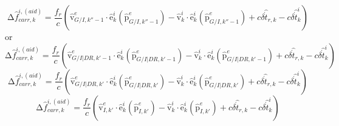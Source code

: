 \documentclass{article}
\begin{document}
\begin{equation}\label{GrindEQ__7_}
\mathrm{\Delta }{\hat{f}}^{i,\left(aid\right)}_{carr,k}\mathrm{=}\frac{f_r}{c}\left({\hat{\boldsymbol{\mathrm{v}}}}^e_{G/I,k''-1}\cdot {\hat{\boldsymbol{\mathrm{e}}}}^i_k\left({\hat{\boldsymbol{\mathrm{p}}}}^e_{G/I,k''-1}\right)-{\hat{\boldsymbol{\mathrm{v}}}}^i_k\cdot {\hat{\boldsymbol{\mathrm{e}}}}^i_k\left({\hat{\boldsymbol{\mathrm{p}}}}^e_{G/I,k''-1}\right)+c\delta {\hat{\dot{t}}}_{r,k}-c\delta {\hat{\dot{t}}}^i_k\right)
\end{equation}
or 
\begin{equation}\label{GrindEQ__8_}
\mathrm{\Delta }{\hat{f}}^{i,\left(aid\right)}_{carr,k}\mathrm{=}\frac{f_r}{c}\left({\hat{\boldsymbol{\mathrm{v}}}}^e_{G/I|DR,k'-1}\cdot {\hat{\boldsymbol{\mathrm{e}}}}^i_k\left({\hat{\boldsymbol{\mathrm{p}}}}^e_{G/I|DR,k'-1}\right)-{\hat{\boldsymbol{\mathrm{v}}}}^i_k\cdot {\hat{\boldsymbol{\mathrm{e}}}}^i_k\left({\hat{\boldsymbol{\mathrm{p}}}}^e_{G/I|DR,k'-1}\right)+c\delta {\hat{\dot{t}}}_{r,k}-c\delta {\hat{\dot{t}}}^i_k\right)
\end{equation}
\begin{equation} \label{GrindEQ__9_}
\mathrm{\Delta }{\hat{f}}^{i,\left(aid\right)}_{carr,k}\mathrm{=}\frac{f_r}{c}\left({\hat{\boldsymbol{\mathrm{v}}}}^e_{G/I|DR,k'}\cdot {\hat{\boldsymbol{\mathrm{e}}}}^i_k\left({\hat{\boldsymbol{\mathrm{p}}}}^e_{G/I|DR,k'}\right)-{\hat{\boldsymbol{\mathrm{v}}}}^i_k\cdot {\hat{\boldsymbol{\mathrm{e}}}}^i_k\left({\hat{\boldsymbol{\mathrm{p}}}}^e_{G/I|DR,k'}\right)+c\delta {\hat{\dot{t}}}_{r,k}-c\delta {\hat{\dot{t}}}^i_k\right)
\end{equation}
\begin{equation}\label{GrindEQ__10_}
\mathrm{\Delta }{\hat{f}}^{i,\left(aid\right)}_{carr,k}\mathrm{=}\frac{f_r}{c}\left({\hat{\boldsymbol{\mathrm{v}}}}^e_{I,k'}\cdot {\hat{\boldsymbol{\mathrm{e}}}}^i_k\left({\hat{\boldsymbol{\mathrm{p}}}}^e_{I,k'}\right)-{\hat{\boldsymbol{\mathrm{v}}}}^i_k\cdot {\hat{\boldsymbol{\mathrm{e}}}}^i_k\left({\hat{\boldsymbol{\mathrm{p}}}}^e_{I,k'}\right)+c\delta {\hat{\dot{t}}}_{r,k}-c\delta {\hat{\dot{t}}}^i_k\right)
\end{equation}
\end{document}
